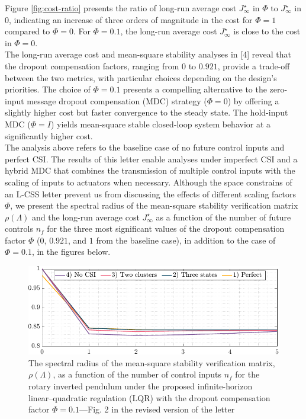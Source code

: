 {Figure \ref{fig:cost-ratio} presents the ratio of long-run average cost $J_{\infty}^{\star}$ in $\mathit{\Phi}$ to $J_{\infty}^{\star}$ in $0$, indicating an increase of three orders of magnitude in the cost for $\mathit{\Phi}=1$ compared to $\mathit{\Phi}=0$. For $\mathit{\Phi}=0.1$, the long-run average cost $J_{\infty}^{\star}$ is close to the cost in $\mathit{\Phi}=0$. \\
The long-run average cost and mean-square stability analyses in [4] reveal that the dropout compensation factors, ranging from $0$ to $0.921$, provide a trade-off between the two metrics, with particular choices depending on the design's priorities. The choice of $\mathit{\Phi} = 0.1$ presents a compelling alternative to the zero-input message dropout compensation (MDC) strategy ($\mathit{\Phi} = 0$) by offering a slightly higher cost but faster convergence to the steady state. The hold-input MDC ($\mathit{\Phi} = I$) yields mean-square stable closed-loop system behavior at a significantly higher cost. \\
The analysis above refers to the baseline case of no future control inputs and perfect CSI. The results of this letter enable analyses under imperfect CSI and a hybrid MDC that combines the transmission of multiple control inputs with the scaling of inputs to actuators when necessary. Although the space constrains of an L-CSS letter prevent us from discussing the effects of different scaling factors $\mathit{\Phi}$, we present the spectral radius of the mean-square stability verification matrix $\rho(\mathit{\Lambda})$ and the long-run average cost $J_{\infty}^{\star}$ as a function of the number of future controls $n_f$ for the three most significant values of the dropout compensation factor $\mathit{\Phi}$ ($0$, $0.921$, and $1$ from the baseline case), in addition to the case of $\mathit{\Phi}=0.1$, in the figures below.
\begin{figure}[h!]
\begin{center}
\includegraphics[width=0.76\columnwidth]{../stability-cntrl-a.pdf}
\caption{The spectral radius of the mean-square stability verification matrix, $\rho(\mathit{\Lambda})$, as a function of the number of control inputs $n_f$ for the rotary inverted pendulum under the proposed infinite-horizon linear–quadratic regulation (LQR) with the dropout compensation factor $\mathit{\Phi}=0.1$—Fig. 2 in the revised version of the letter}\label{fig:stability-coeff-a}

\end{center}
\end{figure}}
